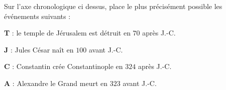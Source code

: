 \documentclass[a4paper,10pt]{report}
\begin{document}
\begin{ex}
Sur l'axe chronologique ci dessus, place le plus précisément possible les événements suivants :

\vspace{5mm}
\begin{center}
\end{center}

\noindent \textbf{T} : le temple de Jérusalem est détruit en $70$ après J.-C.

\noindent \textbf{J} : Jules César naît en $100$ avant J.-C.

\noindent \textbf{C} : Constantin crée Constantinople en $324$ après J.-C.

\noindent \textbf{A} : Alexandre le Grand meurt en $323$ avant J.-C.

\end{ex}
\end{document}
